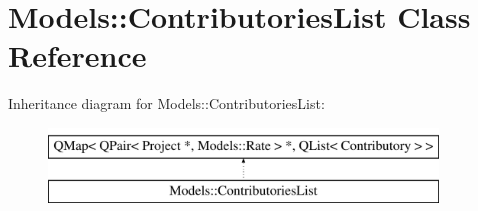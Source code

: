 \hypertarget{classModels_1_1ContributoriesList}{\section{Models\-:\-:Contributories\-List Class Reference}
\label{classModels_1_1ContributoriesList}
}
Inheritance diagram for Models\-:\-:Contributories\-List\-:\begin{figure}[H]
\begin{center}
\leavevmode
\includegraphics[height=2.000000cm]{d7/d6a/classModels_1_1ContributoriesList}
\end{center}
\end{figure}
